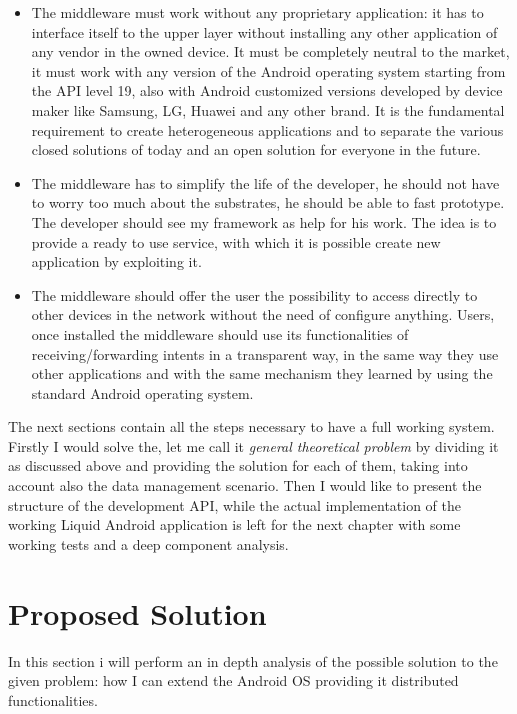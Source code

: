 \begin{itemize}
	\item The middleware must work without any proprietary application: it has to interface itself to the upper layer without installing any other application of any vendor in the owned device. It must be completely neutral to the market, it must work with any version of the Android operating system starting from the API level 19, also with Android customized versions developed by device maker like Samsung, LG, Huawei and any other brand. It is the fundamental requirement to create heterogeneous applications and to separate the various closed solutions of today and an open solution for everyone in the future.
	\item The middleware has to simplify the life of the developer, he should not have to worry too much about the substrates, he should be able to fast prototype. The developer should see my framework as help for his work. The idea is to provide a ready to use service, with which it is possible create new application by exploiting it.
	\item The middleware should offer the user the possibility to access directly to other devices in the network without the need of configure anything. Users, once installed the middleware should use its functionalities of receiving/forwarding intents in a transparent way, in the same way they use other applications and with the same mechanism they learned by using the standard Android operating system.
\end{itemize}
The next sections contain all the steps necessary to have a full working system.
Firstly I would solve the, let me call it \textit{general theoretical problem} by dividing it as discussed above and providing the solution for each of them, taking into account also the data management scenario. Then I would like to present the structure of the development API, while the actual implementation of the working Liquid Android application is left for the next chapter with some working tests and a deep component analysis.


\section{Proposed Solution}
\par In this section i will perform an in depth analysis of the possible solution to the given problem: how I can extend the Android OS providing it distributed functionalities.
